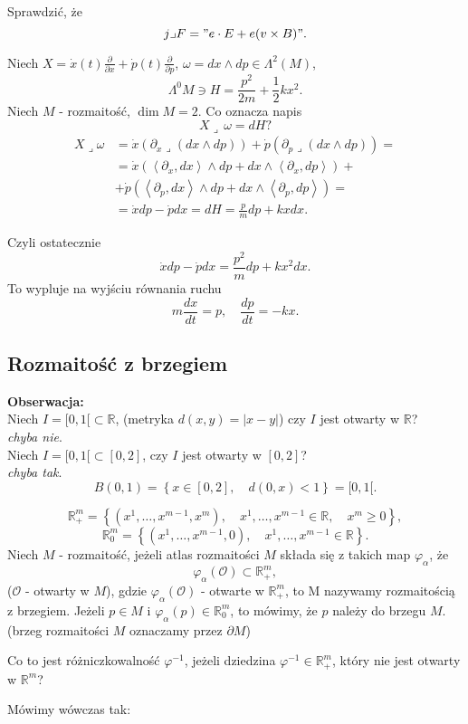 \documentclass[../main.tex]{subfiles}
\begin{document}
    Sprawdzić, że
    \[
        j \lrcorner F = "e\cdot E + e(v\times B)"
    .\]
\begin{przyklad}
    Niech $X = \dot{x}(t)\frac{\partial }{\partial x} + \dot{p}(t)\frac{\partial }{\partial p} $, $\omega = dx\land dp \in \Lambda^2(M)$,
     \[
         \Lambda^0M \ni H = \frac{p^2}{2m} + \frac{1}{2}kx^2
    .\]
Niech $M$ - rozmaitość, $\dim M = 2$. Co oznacza napis
\[
X\lrcorner\, \omega = dH?
\]
\begin{align*}
    X \lrcorner \omega &= \dot{x}\left(\partial_x \lrcorner (dx\land dp)\right) + \dot{p}\left(\partial_p \lrcorner (dx\land dp)\right) =\\
    &= \dot{x}\left(\left<\partial_x, dx \right>\land dp + dx\land \left<\partial_x, dp \right>\right) +\\
    &+ \dot{p}\left(\left<\partial_p, dx \right>\land dp + dx\land\left<\partial_p, dp \right>\right) = \\
    &= \dot{x}dp - \dot{p}dx = dH = \frac{p}{m}dp + kx dx
.\end{align*}

Czyli ostatecznie
\[
    \dot{x}dp - \dot{p}dx = \frac{p^2}{m}dp + kx^2dx
.\]
To wypluje na wyjściu równania ruchu
\[
m \frac{dx}{dt} = p,\quad \frac{dp}{dt} = -kx
.\]
\end{przyklad}
\subsection{Rozmaitość z brzegiem}
\textbf{Obserwacja:}\\
Niech $I = [0,1[\subset\mathbb{R}$, (metryka $d(x,y) = |x-y|$) czy $I$ jest otwarty w $\mathbb{R}$? \\
\textit{chyba nie}.\\
Niech $I = [0,1[\subset[0,2]$, czy $I$ jest otwarty w $[0,2]$? \\
\textit{chyba tak}.
\[
    B(0,1) = \left\{ x\in [0,2],\quad d(0,x) < 1 \right\} = [0,1[
.\]

\pagebreak
\begin{definicja}
    \[
        \mathbb{R}^m_+ = \left\{ (x^1,\ldots,x^{m-1},x^m),\quad x^1,\ldots,x^{m-1}\in\mathbb{R},\quad x^m \ge 0 \right\}
    ,\]
\[
    \mathbb{R}^m_0 = \left\{ (x^1,\ldots,x^{m-1}, 0),\quad x^1,\ldots,x^{m-1}\in\mathbb{R} \right\}
.\]
    Niech $M$ - rozmaitość, jeżeli atlas rozmaitości $M$ składa się z takich map $\varphi_\alpha$, że \[
        \varphi_\alpha(\mathcal{O})\subset\mathbb{R}^m_+
    ,\]
($\mathcal{O}$ - otwarty w $M$), gdzie $\varphi_\alpha(\mathcal{O})$ - otwarte w $\mathbb{R}^m_+$, to M nazywamy rozmaitością z brzegiem. Jeżeli $p\in M$ i $\varphi_\alpha(p)\in \mathbb{R}^m_0$, to mówimy, że $p$ należy do brzegu $M$.\\
    (brzeg rozmaitości $M$ oznaczamy przez $\partial M$)
\end{definicja}
\begin{pytanie}
    Co to jest różniczkowalność $\varphi^{-1}$, jeżeli dziedzina $\varphi^{-1}\in \mathbb{R}^m_+$, który nie jest otwarty w $\mathbb{R}^m$?
\end{pytanie}
Mówimy wówczas tak:
\end{document}
